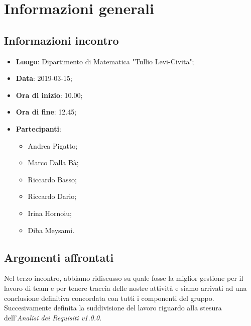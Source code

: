 \section{Informazioni generali}

\subsection{Informazioni incontro}
\begin{itemize}
\item \textbf{Luogo}: Dipartimento di Matematica "Tullio Levi-Civita";
\item \textbf{Data}: 2019-03-15;
\item \textbf{Ora di inizio}: 10.00;
\item \textbf{Ora di fine}: 12.45;
\item \textbf{Partecipanti}: 
\begin{itemize}
	\item Andrea Pigatto;
	\item Marco Dalla Bà;
	\item Riccardo Basso;
	\item Riccardo Dario;
	\item Irina Hornoiu;
	\item Diba Meysami.
\end{itemize}
\end{itemize}

\subsection{Argomenti affrontati}
Nel terzo incontro, abbiamo ridiscusso su quale fosse la miglior gestione per il lavoro di team e per tenere traccia delle nostre attività e siamo arrivati ad una conclusione definitiva concordata con tutti i componenti del gruppo. Succesivamente definita la suddivisione del lavoro riguardo alla stesura dell'\textit{Analisi dei Requisiti v1.0.0}.
